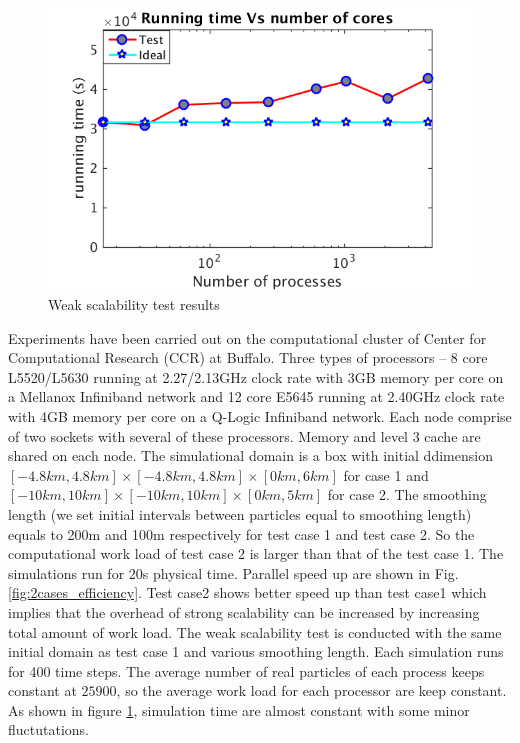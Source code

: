 \documentclass[conference,compsoc]{IEEEtran}
\begin{document}
%
\begin{figure}[!t]
\centering
\includegraphics[scale=0.35]{weak_scale}
\caption{Weak scalability test results}
\label{fig:weak_loglog}
\end{figure}
Experiments have been carried out on the computational cluster of Center for Computational Research (CCR) at Buffalo. 
Three types of processors -- 8 core L5520/L5630 running at 2.27/2.13GHz clock rate with 3GB memory per core on a Mellanox Infiniband network and 12 core E5645 running at 2.40GHz clock rate with 4GB memory per core on a Q-Logic Infiniband network. Each node comprise of two sockets with several of these processors. Memory and level 3 cache are shared on each node. The simulational domain is a box with initial ddimension $[-4.8km, 4.8km]\times [-4.8km, 4.8km] \times [0km, 6km]$ for case 1 and $[-10km, 10km]\times [-10km, 10km] \times [0km, 5km]$ for case 2. The smoothing length (we set initial intervals between particles equal to smoothing length) equals to 200m and 100m respectively for test case 1 and test case 2. So the computational work load of test case 2 is larger than that of the test case 1. The simulations run for 20s physical time.  Parallel speed up are shown in Fig. \ref{fig:2cases_efficiency}. Test case2 shows better speed up than test case1 which implies that the overhead of strong scalability can be increased by increasing total amount of work load.
The weak scalability test is conducted with the same initial domain as test case 1 and various smoothing length. Each simulation runs for 400 time steps. The average number of real particles of each process keeps constant at $25900$, so the average work load for each processor are keep constant. 
As shown in figure \ref{fig:weak_loglog}, simulation time are almost constant with some minor fluctutations.\\
\end{document}
